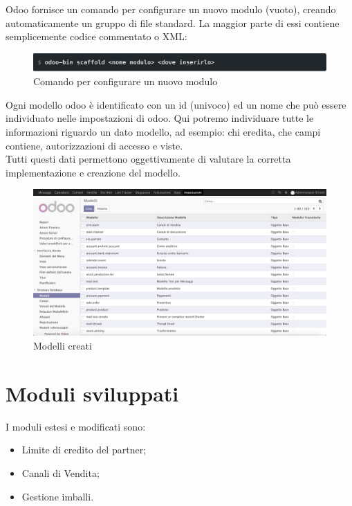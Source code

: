 Odoo fornisce un comando per configurare un nuovo modulo (vuoto), creando automaticamente un gruppo di file standard. La maggior parte di essi contiene semplicemente codice commentato o XML:
\begin{figure}[H]
	\begin{center} \includegraphics[scale=0.6]{figures/scaffold}
		\caption[Comando per configurare un nuovo modulo]{Comando per configurare un nuovo modulo}
		\label{fig:scaffold}
	\end{center}
\end{figure}
\newpage
Ogni modello odoo è identificato con un id (univoco) ed un nome che può essere individuato nelle impostazioni di odoo. Qui potremo individuare tutte le informazioni riguardo un dato modello, ad esempio: chi eredita, che campi contiene, autorizzazioni di accesso e viste. \\
Tutti questi dati permettono oggettivamente di valutare la corretta implementazione e creazione del modello.

\begin{figure}[H]
	\begin{center} \includegraphics[scale=0.35]{figures/Modelli_creati}
		\caption[Modelli creati]{Modelli creati}
		\label{fig:Modelli_creati}
	\end{center}
\end{figure}
\newpage
\section{Moduli sviluppati}

I moduli estesi e modificati sono: \begin{itemize}
	\item Limite di credito del partner;
	\item Canali di Vendita;
	\item Gestione imballi.
\end{itemize}

